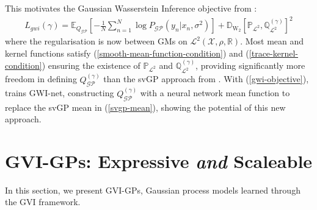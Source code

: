 \documentclass{article}
\newcommand{\WD}{\operatorname{\mathbb{D}_{W_2}}}
\newcommand{\GP}{\operatorname{\mathcal{GP}}}
\numberwithin{equation}{section}
\begin{document}
This motivates the Gaussian Wasserstein Inference objective from \cite{wild2022generalized}:
\begin{align}
    \label{gwi-objective}
    L_{gwi}(\gamma) = \mathbb{E}_{Q_{\GP}}\left[- \frac{1}{N}\sum_{n=1}^N \log P_{\GP}\left(y_n \vert x_n, \sigma^2\right) \right] + \WD \left[\mathbb{P}_{\mathcal{L}^2}, \mathbb{Q}^{(\gamma)}_{\mathcal{L}^2}\right]^2
\end{align}
where the regularisation is now between GMs on $\mathcal{L}^2(\mathcal{X}, \rho, \mathbb{R})$. Most mean and kernel functions satisfy (\ref{smooth-mean-function-condition}) and (\ref{trace-kernel-condition}) ensuring the existence of $\mathbb{P}_{\mathcal{L}^2}$ and $\mathbb{Q}^{(\gamma)}_{\mathcal{L}^2}$, providing significantly more freedom in defining $Q^{(\gamma)}_{\GP}$ than the svGP approach from \cite{titsias2009variational}. With (\ref{gwi-objective}), \cite{wild2022generalized} trains GWI-net, constructing $Q^{(\gamma)}_{\GP}$ with a neural network mean function to replace the svGP mean in (\ref{svgp-mean}), showing the potential of this new approach.


\newpage
\section{GVI-GPs: Expressive \textit{and} Scaleable}
In this section, we present GVI-GPs, Gaussian process models learned through the GVI framework.
\end{document}
